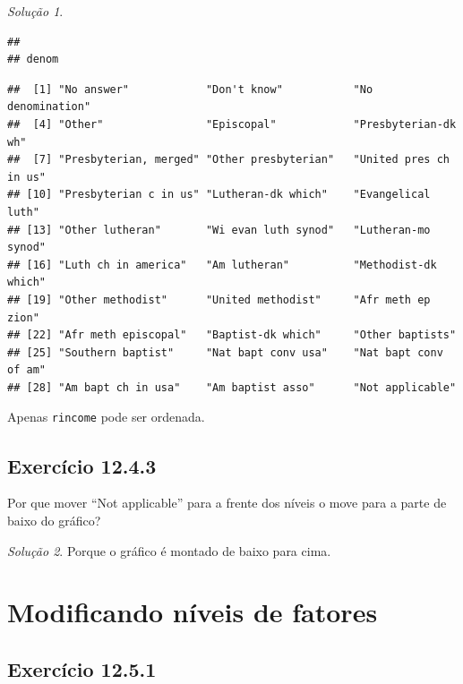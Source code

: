 \documentclass[
]{latex/krantz}
\newenvironment{Shaded}{\begin{snugshade}}{\end{snugshade}}
\newcommand{\FunctionTok}[1]{\textcolor[rgb]{0.13,0.29,0.53}{\textbf{#1}}}
\newcommand{\NormalTok}[1]{#1}
\newcommand{\SpecialCharTok}[1]{\textcolor[rgb]{0.81,0.36,0.00}{\textbf{#1}}}
\theoremstyle{definition}
\theoremstyle{definition}
\theoremstyle{definition}
\theoremstyle{definition}
\theoremstyle{remark}
\newtheorem*{solution}{Solução}
\begin{document}
\begin{solution}
\begin{verbatim}
## 
## denom
\end{verbatim}

\begin{Shaded}
\end{Shaded}

\begin{verbatim}
##  [1] "No answer"            "Don't know"           "No denomination"     
##  [4] "Other"                "Episcopal"            "Presbyterian-dk wh"  
##  [7] "Presbyterian, merged" "Other presbyterian"   "United pres ch in us"
## [10] "Presbyterian c in us" "Lutheran-dk which"    "Evangelical luth"    
## [13] "Other lutheran"       "Wi evan luth synod"   "Lutheran-mo synod"   
## [16] "Luth ch in america"   "Am lutheran"          "Methodist-dk which"  
## [19] "Other methodist"      "United methodist"     "Afr meth ep zion"    
## [22] "Afr meth episcopal"   "Baptist-dk which"     "Other baptists"      
## [25] "Southern baptist"     "Nat bapt conv usa"    "Nat bapt conv of am" 
## [28] "Am bapt ch in usa"    "Am baptist asso"      "Not applicable"
\end{verbatim}

Apenas \texttt{rincome} pode ser ordenada.
\end{solution}

\hypertarget{exr12-4-3}{%
\subsection*{Exercício 12.4.3}\label{exr12-4-3}}

Por que mover ``Not applicable'' para a frente dos níveis o move para a parte de baixo do gráfico?

\begin{solution}
Porque o gráfico é montado de baixo para cima.
\end{solution}

\hypertarget{modificando-nuxedveis-de-fatores}{%
\section{Modificando níveis de fatores}\label{modificando-nuxedveis-de-fatores}}

\hypertarget{exr12-5-1}{%
\subsection*{Exercício 12.5.1}\label{exr12-5-1}}
\end{document}

